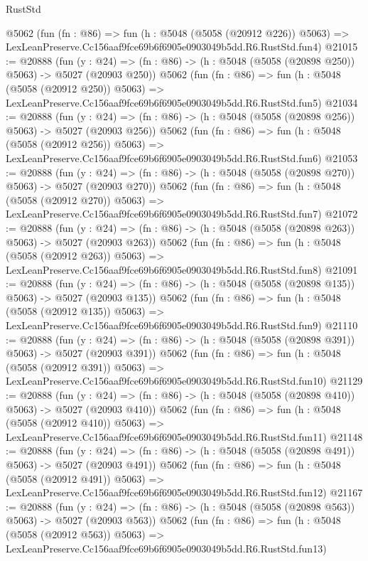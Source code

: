 \begin{lexlean}{RustStd}
\begin{coremodule}
    @5062
    (fun (fn : @86) =>
    fun (h : @5048 (@5058 (@20912 @226)) @5063) =>
    LexLeanPreserve.Cc156aaf9fce69b6f6905e0903049b5dd.R6.RustStd.fun4)
@21015 := @20888
    (fun (y : @24) => (fn : @86) -> (h : @5048 (@5058 (@20898 @250)) @5063) -> @5027 (@20903 @250))
    @5062
    (fun (fn : @86) =>
    fun (h : @5048 (@5058 (@20912 @250)) @5063) =>
    LexLeanPreserve.Cc156aaf9fce69b6f6905e0903049b5dd.R6.RustStd.fun5)
@21034 := @20888
    (fun (y : @24) => (fn : @86) -> (h : @5048 (@5058 (@20898 @256)) @5063) -> @5027 (@20903 @256))
    @5062
    (fun (fn : @86) =>
    fun (h : @5048 (@5058 (@20912 @256)) @5063) =>
    LexLeanPreserve.Cc156aaf9fce69b6f6905e0903049b5dd.R6.RustStd.fun6)
@21053 := @20888
    (fun (y : @24) => (fn : @86) -> (h : @5048 (@5058 (@20898 @270)) @5063) -> @5027 (@20903 @270))
    @5062
    (fun (fn : @86) =>
    fun (h : @5048 (@5058 (@20912 @270)) @5063) =>
    LexLeanPreserve.Cc156aaf9fce69b6f6905e0903049b5dd.R6.RustStd.fun7)
@21072 := @20888
    (fun (y : @24) => (fn : @86) -> (h : @5048 (@5058 (@20898 @263)) @5063) -> @5027 (@20903 @263))
    @5062
    (fun (fn : @86) =>
    fun (h : @5048 (@5058 (@20912 @263)) @5063) =>
    LexLeanPreserve.Cc156aaf9fce69b6f6905e0903049b5dd.R6.RustStd.fun8)
@21091 := @20888
    (fun (y : @24) => (fn : @86) -> (h : @5048 (@5058 (@20898 @135)) @5063) -> @5027 (@20903 @135))
    @5062
    (fun (fn : @86) =>
    fun (h : @5048 (@5058 (@20912 @135)) @5063) =>
    LexLeanPreserve.Cc156aaf9fce69b6f6905e0903049b5dd.R6.RustStd.fun9)
@21110 := @20888
    (fun (y : @24) => (fn : @86) -> (h : @5048 (@5058 (@20898 @391)) @5063) -> @5027 (@20903 @391))
    @5062
    (fun (fn : @86) =>
    fun (h : @5048 (@5058 (@20912 @391)) @5063) =>
    LexLeanPreserve.Cc156aaf9fce69b6f6905e0903049b5dd.R6.RustStd.fun10)
@21129 := @20888
    (fun (y : @24) => (fn : @86) -> (h : @5048 (@5058 (@20898 @410)) @5063) -> @5027 (@20903 @410))
    @5062
    (fun (fn : @86) =>
    fun (h : @5048 (@5058 (@20912 @410)) @5063) =>
    LexLeanPreserve.Cc156aaf9fce69b6f6905e0903049b5dd.R6.RustStd.fun11)
@21148 := @20888
    (fun (y : @24) => (fn : @86) -> (h : @5048 (@5058 (@20898 @491)) @5063) -> @5027 (@20903 @491))
    @5062
    (fun (fn : @86) =>
    fun (h : @5048 (@5058 (@20912 @491)) @5063) =>
    LexLeanPreserve.Cc156aaf9fce69b6f6905e0903049b5dd.R6.RustStd.fun12)
@21167 := @20888
    (fun (y : @24) => (fn : @86) -> (h : @5048 (@5058 (@20898 @563)) @5063) -> @5027 (@20903 @563))
    @5062
    (fun (fn : @86) =>
    fun (h : @5048 (@5058 (@20912 @563)) @5063) =>
    LexLeanPreserve.Cc156aaf9fce69b6f6905e0903049b5dd.R6.RustStd.fun13)

\end{coremodule}
\end{lexlean}
